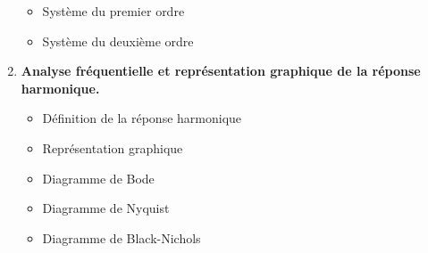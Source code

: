 \documentclass[a4paper,11pt]{article}
\begin{document}
\begin{enumerate}
\begin{itemize}
            \item Système du premier ordre
            \item Système du deuxième ordre
        \end{itemize}
    \item \textbf{Analyse fréquentielle et représentation graphique de la réponse harmonique.}
        \begin{itemize}
            \item Définition de la réponse harmonique
            \item Représentation graphique
            \item Diagramme de Bode
            \item Diagramme de Nyquist
            \item Diagramme de Black-Nichols
        \end{itemize}
\end{enumerate}
\end{document}
